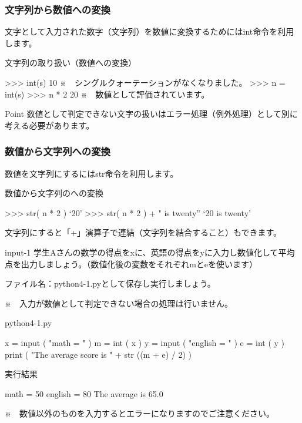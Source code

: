 \documentclass[11pt,a4paper,dvipdfmx,titlepage]{jsreport}
\begin{document}
\subsubsection{文字列から数値への変換}
文字として入力された数字（文字列）を数値に変換するためにはint命令を利用します。
\begin{grabox}{文字列の取り扱い（数値への変換）}
\begin{listingcont}
>>> int(s)
10
※　シングルクォーテーションがなくなりました。
>>> n = int(s)
>>> n * 2
20
※　数値として評価されています。
\end{listingcont}
\end{grabox}
\begin{hipoint}{Point}
数値として判定できない文字の扱いはエラー処理（例外処理）として別に考える必要があります。
\end{hipoint}
\subsubsection{数値から文字列への変換}
数値を文字列にするにはstr命令を利用します。
\begin{grabox}{数値から文字列のへの変換}
\begin{listingcont}
>>> str( n * 2 )
‘20’
>>> str( n * 2 ) + " is twenty”
‘20 is twenty’
\end{listingcont}
\end{grabox}
文字列にすると「+」演算子で連結（文字列を結合すること）もできます。

\begin{pabox}{input-1}
学生Aさんの数学の得点をxに、英語の得点をyに入力し数値化して平均点を出力しましょう。（数値化後の変数をそれぞれmとeを使います）

ファイル名：python4-1.pyとして保存し実行しましょう。

※　入力が数値として判定できない場合の処理は行いません。
\begin{legbox}{python4-1.py}
\begin{listing}{1}
x = input ( "math = " )
m = int ( x ) 
y = input ( "english = " )
e = int ( y )
print ( "The average score is " + str ((m + e) / 2) )
\end{listing}
実行結果
\begin{listing}{1}
math = 50
english = 80
The average is 65.0
\end{listing}
\end{legbox}


※　数値以外のものを入力するとエラーになりますのでご注意ください。
\end{pabox}
\end{document}
